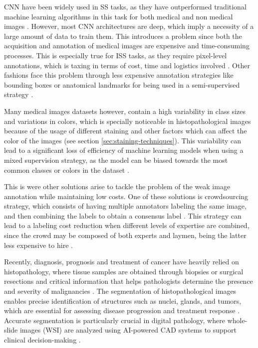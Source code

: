 \gls{CNN} have been widely used in \gls{SS} tasks, as they have outperformed
traditional machine learning algorithms in this task for both medical
and non medical images \cite{XuYan2024} \cite{Sarvamangala2022}.
However, most \gls{CNN} architectures are deep, which imply
a necessity of a large amount of data to train them. This introduces
a problem since both the acquisition and annotation of medical images
are expensive and time-consuming processes. This is especially true
for \gls{ISS} tasks, as they require pixel-level annotations, which
is taxing in terms of cost, time and logistics involved
\cite{Bhalgat2018}. Other fashions face this problem through less expensive
annotation strategies like bounding boxes or anatomical landmarks for
being used in a semi-supervised strategy \cite{Shah2018}.


Many medical images datasets however, contain a high variability in
class sizes and variations in colors, which is specially noticeable
in histopathological images because of the usage of different
staining and other factors which can affect the color of the images
(see section \ref{sec:staining-techniques}).
This variability can lead to a significant loss of efficiency of
machine learning models when using a mixed supervision strategy, as
the model can be biased towards the most common classes or colors in
the dataset \cite{Shah2018}.

This is were other solutions arise to tackle the problem of the weak
image annotation while maintaining low costs. One of these solutions
is crowdsourcing strategy, which consists of having multiple annotators
labeling the same image, and then combining the labels to obtain a
consensus label \cite{LuEtAl2023}. This strategy can lead to a
labeling cost reduction when different levels of expertise are
combined, since the crowd may be composed of both experts and laymen,
being the latter less expensive to hire \cite{Lopez2023}.

Recently, diagnosis, prognosis and treatment of cancer have heavily
relied on histopathology, where tissue samples are obtained through biopsies or
surgical resections and critical information that helps
pathologists determine the presence and severity of malignancies
\cite{LopezEtAl2024}. The segmentation of histopathological images
enables precise identification of structures such as nuclei, glands, and tumors,
which are essential for assessing disease progression and treatment
response \cite{Rashmi2021}. Accurate segmentation is particularly
crucial in digital pathology, where whole-slide images (\gls{WSI})
are analyzed using AI-powered \gls{CAD} systems to support
clinical decision-making \cite{LopezEtAl2024}.

